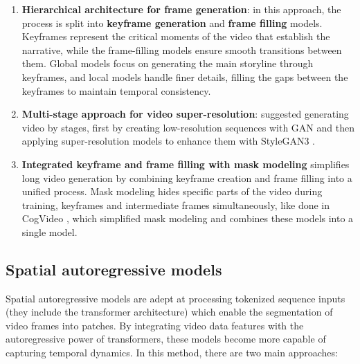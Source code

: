 \begin{enumerate}
    \item \textbf{Hierarchical architecture for frame generation}: in this approach, the process is split into \textbf{keyframe generation} and \textbf{frame filling} models. Keyframes represent the critical moments of the video that establish the narrative, while the frame-filling models ensure smooth transitions between them. Global models focus on generating the main storyline through keyframes, and local models handle finer details, filling the gaps between the keyframes to maintain temporal consistency.
    \item \textbf{Multi-stage approach for video super-resolution}: \cite{brooks2022generating} suggested generating video by stages, first by creating low-resolution sequences with GAN and then applying super-resolution models to enhance them with StyleGAN3 \cite{stylegan3}.
    \item \textbf{Integrated keyframe and frame filling with mask modeling} simplifies long video generation by combining keyframe creation and frame filling into a unified process. Mask modeling hides specific parts of the video during training, keyframes and intermediate frames simultaneously, like done in CogVideo \cite{cogvideo}, which simplified mask modeling and combines these models into a single model.
\end{enumerate}














\subsection*{Spatial autoregressive models}

Spatial autoregressive models are adept at processing tokenized sequence inputs (they include the transformer architecture) which enable the segmentation of video frames into patches. By integrating video data features with the autoregressive power of transformers, these models become more capable of capturing temporal dynamics. In this method, there are two main approaches:


